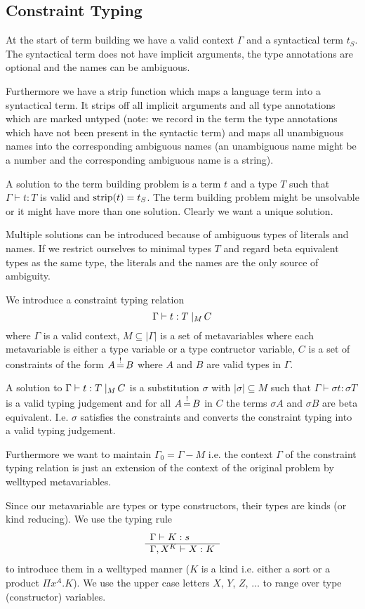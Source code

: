 \subsection{Constraint Typing}

At the start of term building we have a valid context $\Gamma$ and a syntactical
term $t_S$. The syntactical term does not have implicit arguments, the type
annotations are optional and the names can be ambiguous.

Furthermore we have a strip function which maps a language term into a
syntactical term. It strips off all implicit arguments and all type annotations
which are marked untyped (note: we record in the term the type annotations which
have not been present in the syntactic term) and maps all unambiguous names into
the corresponding ambiguous names (an unambiguous name might be a number and the
corresponding ambiguous name is a string).

A solution to the term building problem is a term $t$ and a type $T$ such that
$\Gamma \vdash t: T$ is valid and $\text{strip}(t) = t_S$. The term building problem
might be unsolvable or it might have more than one solution. Clearly we want a
unique solution.

Multiple solutions can be introduced because of ambiguous types of literals and
names. If we restrict ourselves to minimal types $T$ and regard beta equivalent
types as the same type, the literals and the names are the only source of
ambiguity.


We introduce a constraint typing relation
$$
\Gamma \vdash t:T \; |_{M} \, C
$$
where $\Gamma$ is a valid context, $M \subseteq |\Gamma|$ is a set of
metavariables where each metavariable is either a type variable or a type
contructor variable, $C$ is a set of constraints of the form $A {\,\stackrel{!}{=}\,} B$ where
$A$ and $B$ are valid types in $\Gamma$.

A solution to $\Gamma \vdash t:T \; |_{M} \, C$ is a substitution $\sigma$ with
$|\sigma| \subseteq M$ such that $\Gamma \vdash \sigma t: \sigma T$ is a valid
typing judgement and for all $A{\,\stackrel{!}{=}\,} B$ in $C$ the terms $\sigma A$ and
$\sigma B$ are beta equivalent. I.e. $\sigma$ satisfies the constraints and
converts the constraint typing into a valid typing judgement.

Furthermore we want to maintain $\Gamma_0 = \Gamma - M$ i.e. the context
$\Gamma$ of the constraint typing relation is just an extension of the context
of the original problem by welltyped metavariables.

Since our metavariable are types or type constructors, their types are kinds (or
kind reducing). We use the typing rule
$$
\begin{array}{l} \Gamma \vdash K: s \\ \hline \Gamma, X^K \vdash X: K\end{array}
$$
to introduce them in a welltyped manner ($K$ is a kind i.e. either a sort or a
product $\Pi x^A. K$). We use the upper case letters $X$, $Y$, $Z$, $\ldots$ to
range over type (constructor) variables.


